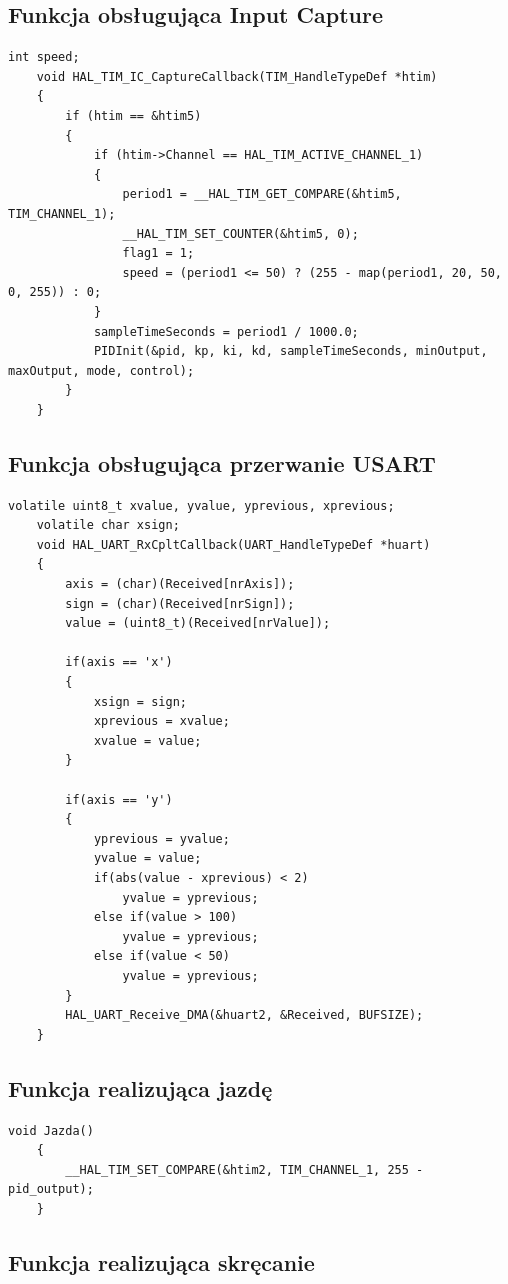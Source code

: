 \documentclass[10pt, a4paper]{article}
\begin{document}
\subsection{Funkcja obsługująca Input Capture}
	\begin{lstlisting}[tabsize=2]
	int speed;
	void HAL_TIM_IC_CaptureCallback(TIM_HandleTypeDef *htim)
	{
		if (htim == &htim5)
		{
			if (htim->Channel == HAL_TIM_ACTIVE_CHANNEL_1)
			{
				period1 = __HAL_TIM_GET_COMPARE(&htim5, TIM_CHANNEL_1);
				__HAL_TIM_SET_COUNTER(&htim5, 0);
				flag1 = 1;
				speed = (period1 <= 50) ? (255 - map(period1, 20, 50, 0, 255)) : 0;
			}
			sampleTimeSeconds = period1 / 1000.0;
			PIDInit(&pid, kp, ki, kd, sampleTimeSeconds, minOutput, maxOutput, mode, control);
		}
	}
	\end{lstlisting}

\subsection{Funkcja obsługująca przerwanie USART}

	\begin{lstlisting}[tabsize=2]
	volatile uint8_t xvalue, yvalue, yprevious, xprevious;
	volatile char xsign;
	void HAL_UART_RxCpltCallback(UART_HandleTypeDef *huart) 
	{
		axis = (char)(Received[nrAxis]);
		sign = (char)(Received[nrSign]);
		value = (uint8_t)(Received[nrValue]);
		
		if(axis == 'x')
		{
			xsign = sign;
			xprevious = xvalue;
			xvalue = value;
		}
		
		if(axis == 'y')
		{
			yprevious = yvalue;
			yvalue = value;
			if(abs(value - xprevious) < 2)
				yvalue = yprevious;
			else if(value > 100)
				yvalue = yprevious;
			else if(value < 50)
				yvalue = yprevious;
		}
		HAL_UART_Receive_DMA(&huart2, &Received, BUFSIZE);
	}
	\end{lstlisting}
	
	\subsection{Funkcja realizująca jazdę}
	
	\begin{lstlisting}[tabsize=2]
	void Jazda()
	{
		__HAL_TIM_SET_COMPARE(&htim2, TIM_CHANNEL_1, 255 - pid_output);
	}
	\end{lstlisting}
	
	\subsection{Funkcja realizująca skręcanie}
	
\end{document}
